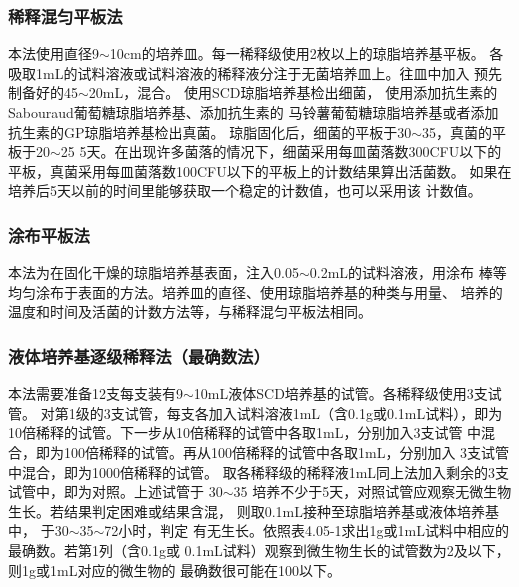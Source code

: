\documentclass[11pt,a4paper]{article}
\newenvironment{SC}{%
  \CJKfamily{gbsn}%
  \CJKtilde
  \CJKnospace}{}
\begin{document}
\begin{CJK}{UTF8}{}
\begin{SC}
\subsubsection{稀释混匀平板法}
本法使用直径9$\sim$10cm的培养皿。每一稀释级使用2枚以上的琼脂培养基平板。
各吸取1mL的试料溶液或试料溶液的稀释液分注于无菌培养皿上。往皿中加入
预先制备好的45$\sim$20mL，混合。
使用SCD琼脂培养基检出细菌，
使用添加抗生素的Sabouraud葡萄糖琼脂培养基、添加抗生素的
马铃薯葡萄糖琼脂培养基或者添加抗生素的GP琼脂培养基检出真菌。
琼脂固化后，细菌的平板于30$\sim$35\textcelsius，真菌的平板于20$\sim$25
5天。在出现许多菌落的情况下，细菌采用每皿菌落数300CFU以下的
平板，真菌采用每皿菌落数100CFU以下的平板上的计数结果算出活菌数。
如果在培养后5天以前的时间里能够获取一个稳定的计数值，也可以采用该
计数值。

\subsubsection{涂布平板法}
本法为在固化干燥的琼脂培养基表面，注入0.05$\sim$0.2mL的试料溶液，用涂布
棒等均匀涂布于表面的方法。培养皿的直径、使用琼脂培养基的种类与用量、
培养的温度和时间及活菌的计数方法等，与稀释混匀平板法相同。

\subsubsection{液体培养基逐级稀释法（最确数法）\endnote{}}
本法需要准备12支每支装有9$\sim$10mL液体SCD培养基的试管。各稀释级使用3支试管。
对第1级的3支试管，每支各加入试料溶液1mL（含0.1g或0.1mL试料），即为
10倍稀释的试管。下一步从10倍稀释的试管中各取1mL，分别加入3支试管
中混合，即为100倍稀释的试管。再从100倍稀释的试管中各取1mL，分别加入
3支试管中混合，即为1000倍稀释的试管。
取各稀释级的稀释液1mL同上法加入剩余的3支试管中，即为对照。上述试管于
30$\sim$35\textcelsius
培养不少于5天，对照试管应观察无微生物生长。若结果判定困难或结果含混，
则取0.1mL接种至琼脂培养基或液体培养基中，
于30$\sim$35$\sim$72小时，判定
有无生长。依照表4.05-1求出1g或1mL试料中相应的最确数。若第1列（含0.1g或
0.1mL试料）观察到微生物生长的试管数为2及以下，则1g或1mL对应的微生物的
最确数很可能在100以下。


\end{SC}
\end{CJK}
\end{document}
